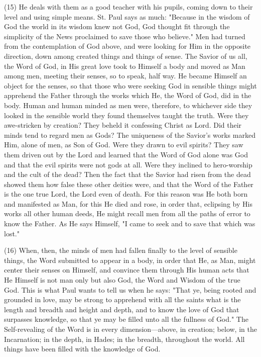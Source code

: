 \documentclass[9pt, twocolumn, oneside, a4paper]{memoir}
\begin{document}
\textsc{(15)} He deals with them as a good teacher with his       pupils, coming down to their level and using simple means. St. Paul says as       much:       "Because in the wisdom of God the world in its wisdom       knew not God, God thought fit through the simplicity of the News proclaimed to       save those who believe."       Men had turned from the contemplation of God above, and were       looking for Him in the opposite direction, down among created things and things       of sense. The Savior of us all, the Word of God, in His great love took to       Himself a body and moved as Man among men, meeting their senses, so to speak,       half way. He became Himself an object for the senses, so that those who were       seeking God in sensible things might apprehend the Father through the works       which He, the Word of God, did in the body. Human and human minded as men were,       therefore, to whichever side they looked in the sensible world they found       themselves taught the truth. Were they awe-stricken by creation? They beheld it       confessing Christ as Lord. Did their minds tend to regard men as Gods? The       uniqueness of the Savior's works marked Him, alone of men, as Son of God. Were       they drawn to evil spirits? They saw them driven out by the Lord and learned       that the Word of God alone was God and that the evil spirits were not gods at       all. Were they inclined to hero-worship and the cult of the dead? Then the fact       that the Savior had risen from the dead showed them how false these other       deities were, and that the Word of the Father is the one true Lord, the Lord       even of death. For this reason was He both born and manifested as Man, for this       He died and rose, in order that, eclipsing by His works all other human deeds,       He might recall men from all the paths of error to know the Father. As He says       Himself,       "I came to seek and to save that which was lost."

\textsc{(16)} When, then, the minds of men had fallen finally to       the level of sensible things, the Word submitted to appear in a body, in order       that He, as Man, might center their senses on Himself, and convince them through       His human acts that He Himself is not man only but also God, the Word and Wisdom of       the true God. This is what Paul wants to tell us when he says:       "That ye, being rooted and grounded in love, may be       strong to apprehend with all the saints what is the length and breadth and       height and depth, and to know the love of God that surpasses knowledge, so       that ye may be filled unto all the fullness of God."        The Self-revealing of the Word is in every dimension—above, in       creation; below, in the Incarnation; in the depth, in Hades; in the breadth,       throughout the world. All things have been filled with the knowledge of God.   
\end{document}
